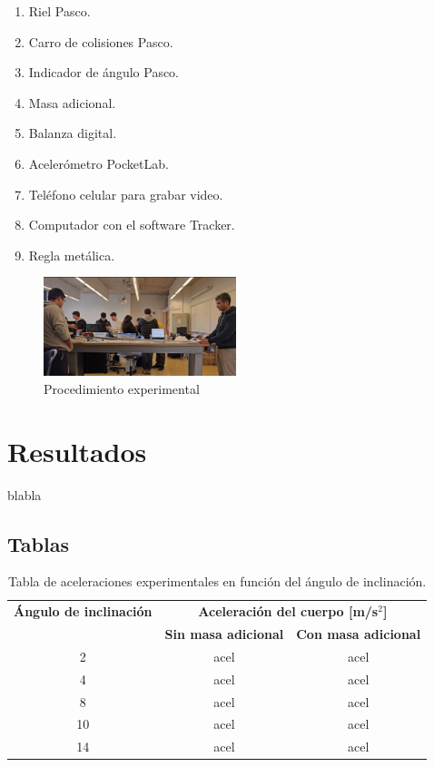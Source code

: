 \documentclass[twocolumn,12pt]{article}
\begin{document}
	\begin{enumerate}
	\item Riel Pasco.
	\item Carro de colisiones Pasco.
	\item Indicador de ángulo Pasco.
	\item Masa adicional.
	\item Balanza digital.
	\item Acelerómetro PocketLab.
	\item Teléfono celular para grabar video.
	\item Computador con el software Tracker. 
	\item Regla metálica.
	\end{enumerate}	
	
	\begin{figure}[h]
	\centering
	\includegraphics[width=0.5\textwidth]{./Multimedia/fotografia_laboratorio.png}
	\caption{ Procedimiento experimental}
	\label{Imagen:mi_imagen}
	\end{figure}
	
	\section{Resultados}
	blabla
	
	\subsection{Tablas}

	\onecolumn
	\begin{table}[h!]
	\centering
	\begin{tabular}{|c|c|c|}
	\hline
	\textbf{Ángulo de inclinación} & \multicolumn{2}{c|}{\textbf{Aceleración del cuerpo [m/s\(^2\)]}} \\ \cline{2-3}
	\textbf{} & \textbf{Sin masa adicional} & \textbf{Con masa adicional} \\ \hline
	2\textdegree & acel & acel \\ \hline
	4\textdegree & acel & acel \\ \hline
	8\textdegree & acel & acel \\ \hline
	10\textdegree & acel & acel \\ \hline
	14\textdegree & acel & acel \\ \hline
	\end{tabular}
	\caption{Tabla de aceleraciones experimentales en función del ángulo de inclinación.}
	\label{tabla:aceleraciones}
	\end{table}
	
\end{document}
